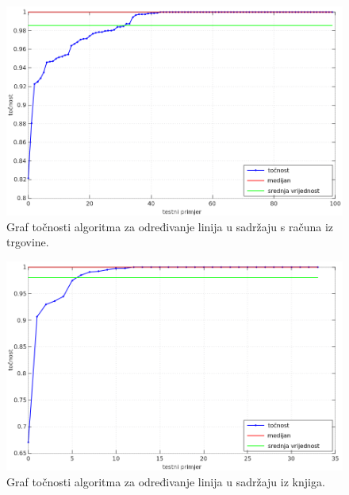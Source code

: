 \documentclass[times, utf8, zavrsni]{fer}
\begin{document}
\begin{figure}[htb]
    \centering
    \captionsetup{justification=centering,margin=2cm}
    \includegraphics[width=\textwidth]{images/result-01.png}
    \caption{
        Graf točnosti algoritma za određivanje linija u sadržaju s računa iz trgovine.
    }
    \label{fig:result-01}
\end{figure}

\begin{figure}[htb]
    \centering
    \captionsetup{justification=centering,margin=2cm}
    \includegraphics[width=\textwidth]{images/result-02.png}
    \caption{
        Graf točnosti algoritma za određivanje linija u sadržaju iz knjiga.
    }
    \label{fig:result-02}
\end{figure}
\end{document}
